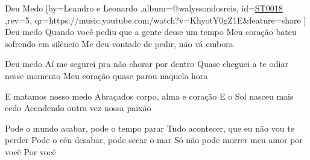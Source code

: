\beginsong
{Deu Medo %
}[by={Leandro e Leonardo %
},album={@walyssondosreis},
id={\href{https://music.youtube.com/watch?v=KhyotY0gZ1E&feature=share %
}{ST0018 %
}},rev={5}, %
qr={https://music.youtube.com/watch?v=KhyotY0gZ1E&feature=share %
}]
\beginverse
Deu medo
Quando você pediu que a gente desse um tempo
Meu coração bateu sofrendo em silêncio
Me deu vontade de pedir, não vá embora
\endverse

\beginverse
Deu medo
Aí me segurei pra não chorar por dentro
Quase cheguei a te odiar nesse momento
Meu coração quase parou naquela hora
\endverse

\beginverse
E matamos nosso medo
Abraçados corpo, alma e coração
E o Sol nasceu mais cedo
Acendendo outra vez nossa paixão
\endverse

\beginchorus
Pode o mundo acabar, pode o tempo parar
Tudo acontecer, que eu não vou te perder
Pode o céu desabar, pode secar o mar
Só não pode morrer meu amor por você
Por você
\endchorus
{}

